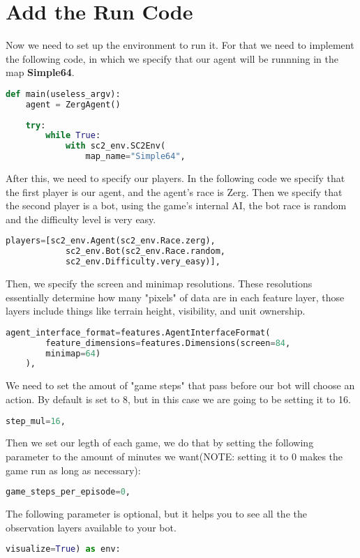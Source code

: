 \documentclass[11pt]{report}            %
\begin{document}
\chapter{Add the Run Code}
Now we need to set up the environment to run it. For that we need to implement the following code, in which we specify that our agent will be runnning in the map \textbf{Simple64}.
\begin{lstlisting}[language=Python]
    def main(useless_argv):
    agent = ZergAgent()
    
    try:
        while True:
            with sc2_env.SC2Env(
                map_name="Simple64",
\end{lstlisting}
After this, we need to specify our players. In the following code we specify that the first player is our agent, and the agent's race is Zerg. Then we specify that the second player is a bot, using the game's internal AI, the bot race is random and the difficulty level is very easy.
\begin{lstlisting}[language=Python]
    players=[sc2_env.Agent(sc2_env.Race.zerg),
            sc2_env.Bot(sc2_env.Race.random,
            sc2_env.Difficulty.very_easy)],
\end{lstlisting}
Then, we specify the screen and minimap resolutions. These resolutions essentially determine how many "pixels" of data are in each feature layer, those layers include things like terrain height, visibility, and unit ownership.
\begin{lstlisting}[language=Python]
    agent_interface_format=features.AgentInterfaceFormat(
        feature_dimensions=features.Dimensions(screen=84,
        minimap=64)
    ),
\end{lstlisting}
We need to set the amout of "game steps" that pass before our bot will choose an action. By default is set to 8, but in this case we are going to be setting it to 16.
\begin{lstlisting}[language=Python]
    step_mul=16,
\end{lstlisting}
Then we set our legth of each game, we do that by setting the following parameter to the amount of minutes we want(NOTE: setting it to 0 makes the game run as long as necessary):
\begin{lstlisting}[language=Python]
    game_steps_per_episode=0,
\end{lstlisting}
The following parameter is optional, but it helps you to see all the the observation layers available to your bot.
\begin{lstlisting}[language=Python]
    visualize=True) as env:
\end{lstlisting}
\end{document}
